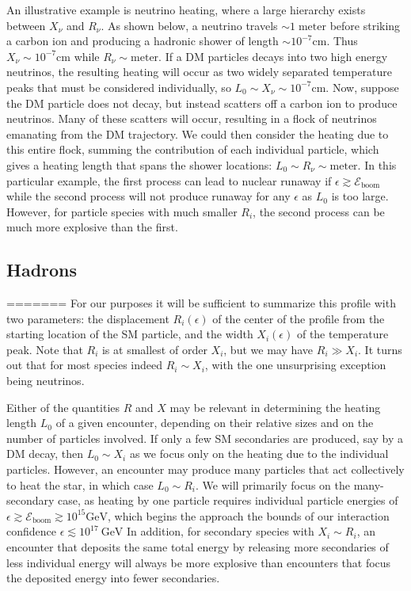 \documentclass[twocolumn,showpacs,preprintnumbers,amsmath,amssymb,prd]{revtex4}
\newcommand{\GeV}{\text{GeV}}
\begin{document}
An illustrative example is neutrino heating, where a large hierarchy exists between $X_\nu$ and $R_\nu$.
As shown below, a neutrino travels $\sim 1\;\text{meter}$ before striking a carbon ion and producing a hadronic shower of length $ \sim 10^{-7} \text{cm}$.
Thus $X_\nu \sim 10^{-7} \text{cm}$ while $R_\nu \sim \text{meter}$.
If a DM particles decays into two high energy neutrinos, the resulting heating will occur as two widely separated temperature peaks that must be considered individually, so $L_0 \sim X_\nu \sim 10^{-7} \text{cm}$.
Now, suppose the DM particle does not decay, but instead scatters off a carbon ion to produce neutrinos.
Many of these scatters will occur, resulting in a flock of neutrinos emanating from the DM trajectory.  
We could then consider the heating due to this entire flock, summing the contribution of each individual particle, which gives a heating length that spans the shower locations: $L_0 \sim R_\nu \sim \text{meter}$. 
In this particular example, the first process can lead to nuclear runaway if $\epsilon \gtrsim \mathcal{E}_\text{boom}$ while the second process will not produce runaway for any $\epsilon$ as $L_0$ is too large.
However, for particle species with much smaller $R_i$, the second process can be much more explosive than the first.

\subsection{Hadrons}
=======
For our purposes it will be sufficient to summarize this profile with two parameters: the displacement $R_i(\epsilon)$ of the center of the profile from the starting location of the SM particle, and the width $X_i(\epsilon)$ of the temperature peak.  
Note that $R_i$ is at smallest of order $X_i$, but we may have $R_i \gg X_i$.
It turns out that for most species indeed $R_i \sim X_i$, with the one unsurprising exception being neutrinos.

Either of the quantities $R$ and $X$ may be relevant in determining the heating length $L_0$ of a given encounter, depending on their relative sizes and on the number of particles involved.
If only a few SM secondaries are produced, say by a DM decay, then $L_0 \sim X_i$ as we focus only on the heating due to the individual particles.
However, an encounter may produce many particles that act collectively to heat the star, in which case $L_0 \sim R_i$. 
We will primarily focus on the many-secondary case, as heating by one particle requires individual particle energies of $\epsilon \gtrsim \mathcal{E}_\text{boom} \gtrsim 10^15 \GeV$, which begins the approach the bounds of our interaction confidence $\epsilon \lesssim 10^{17} ~\GeV$
In addition, for secondary species with $X_i \sim R_i$, an encounter that deposits the same total energy by releasing more secondaries of less individual energy will always be more explosive than encounters that focus the deposited energy into fewer secondaries. 
\end{document}
